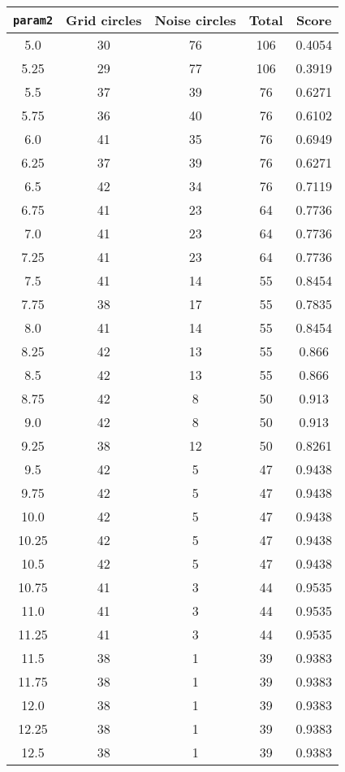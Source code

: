\documentclass[letterpaper, 12pt]{article}
\begin{document}
\begin{longtable}{|c|c|c|c|c|}
\hline
\textbf{\texttt{param2}} & \textbf{Grid circles} & \textbf{Noise circles} & \textbf{Total} & \textbf{Score} \\
\hline
5.0 & 30 & 76 & 106 & 0.4054 \\
\hline
5.25 & 29 & 77 & 106 & 0.3919 \\
\hline
5.5 & 37 & 39 & 76 & 0.6271 \\
\hline
5.75 & 36 & 40 & 76 & 0.6102 \\
\hline
6.0 & 41 & 35 & 76 & 0.6949 \\
\hline
6.25 & 37 & 39 & 76 & 0.6271 \\
\hline
6.5 & 42 & 34 & 76 & 0.7119 \\
\hline
6.75 & 41 & 23 & 64 & 0.7736 \\
\hline
7.0 & 41 & 23 & 64 & 0.7736 \\
\hline
7.25 & 41 & 23 & 64 & 0.7736 \\
\hline
7.5 & 41 & 14 & 55 & 0.8454 \\
\hline
7.75 & 38 & 17 & 55 & 0.7835 \\
\hline
8.0 & 41 & 14 & 55 & 0.8454 \\
\hline
8.25 & 42 & 13 & 55 & 0.866 \\
\hline
8.5 & 42 & 13 & 55 & 0.866 \\
\hline
8.75 & 42 & 8 & 50 & 0.913 \\
\hline
9.0 & 42 & 8 & 50 & 0.913 \\
\hline
9.25 & 38 & 12 & 50 & 0.8261 \\
\hline
9.5 & 42 & 5 & 47 & 0.9438 \\
\hline
9.75 & 42 & 5 & 47 & 0.9438 \\
\hline
10.0 & 42 & 5 & 47 & 0.9438 \\
\hline
10.25 & 42 & 5 & 47 & 0.9438 \\
\hline
10.5 & 42 & 5 & 47 & 0.9438 \\
\hline
10.75 & 41 & 3 & 44 & 0.9535 \\
\hline
11.0 & 41 & 3 & 44 & 0.9535 \\
\hline
11.25 & 41 & 3 & 44 & 0.9535 \\
\hline
11.5 & 38 & 1 & 39 & 0.9383 \\
\hline
11.75 & 38 & 1 & 39 & 0.9383 \\
\hline
12.0 & 38 & 1 & 39 & 0.9383 \\
\hline
12.25 & 38 & 1 & 39 & 0.9383 \\
\hline
12.5 & 38 & 1 & 39 & 0.9383 \\

\end{longtable}
\end{document}
